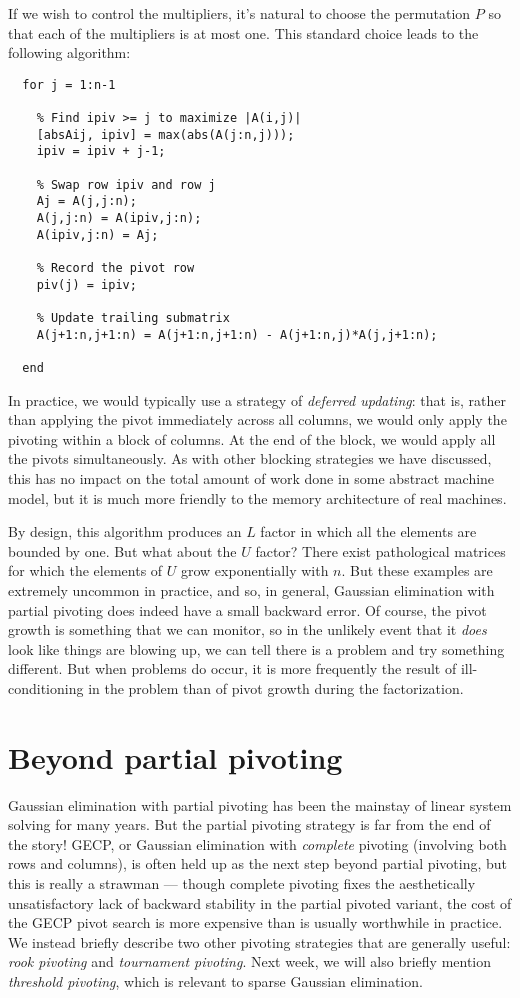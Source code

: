 \documentclass[12pt, leqno]{article} %
\begin{document}
If we wish to control the multipliers, it's natural to choose
the permutation $P$ so that each of the multipliers is at most one.
This standard choice leads to the following algorithm:
\begin{lstlisting}
  for j = 1:n-1

    % Find ipiv >= j to maximize |A(i,j)|
    [absAij, ipiv] = max(abs(A(j:n,j)));
    ipiv = ipiv + j-1;

    % Swap row ipiv and row j
    Aj = A(j,j:n);
    A(j,j:n) = A(ipiv,j:n);
    A(ipiv,j:n) = Aj;

    % Record the pivot row
    piv(j) = ipiv;

    % Update trailing submatrix
    A(j+1:n,j+1:n) = A(j+1:n,j+1:n) - A(j+1:n,j)*A(j,j+1:n);

  end
\end{lstlisting}
In practice, we would typically use a strategy of
{\em deferred updating}: that is, rather than applying the
pivot immediately across all columns, we would only apply
the pivoting within a block of columns.  At the end of the
block, we would apply all the pivots simultaneously.  As with
other blocking strategies we have discussed, this has no impact
on the total amount of work done in some abstract machine model,
but it is much more friendly to the memory architecture of real
machines.

By design, this algorithm produces an $L$ factor in which all the
elements are bounded by one.  But what about the $U$ factor?  There
exist pathological matrices for which the elements of $U$ grow
exponentially with $n$.  But these examples are extremely uncommon in
practice, and so, in general, Gaussian elimination with partial
pivoting does indeed have a small backward error.  Of course, the
pivot growth is something that we can monitor, so in the unlikely event
that it {\em does} look like things are blowing up, we can tell there
is a problem and try something different.
But when problems do occur, it is more frequently the result of
ill-conditioning in the problem than of pivot growth during the
factorization.

\section{Beyond partial pivoting}

Gaussian elimination with partial pivoting has been the mainstay of
linear system solving for many years.  But the partial pivoting
strategy is far from the end of the story!  GECP, or Gaussian elimination
with {\em complete} pivoting (involving both rows and columns),
is often held up as the next step beyond partial pivoting,
but this is really a strawman --- though complete pivoting fixes
the aesthetically unsatisfactory lack of backward stability in the
partial pivoted variant, the cost of the GECP pivot search is
more expensive than is usually worthwhile in practice.  We instead
briefly describe two other pivoting strategies that are generally
useful: {\em rook pivoting} and {\em tournament pivoting}.  Next week,
we will also briefly mention {\em threshold pivoting}, which is relevant
to sparse Gaussian elimination.
\end{document}
